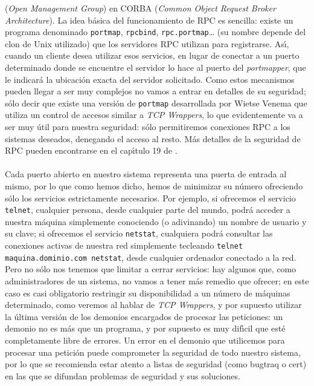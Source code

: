 ({\it Open Management Group}) en CORBA ({\it Common Object Request Broker 
Architecture}). La idea b\'asica del funcionamiento de RPC es sencilla: existe
un programa denominado {\tt portmap}, {\tt rpcbind}, {\tt rpc.portmap}\ldots
(su nombre depende del clon de Unix utilizado) que los servidores RPC utilizan
para registrarse. As\'{\i}, cuando un cliente desea utilizar esos servicios, 
en lugar de conectar a un puerto determinado donde se encuentre el servidor lo
hace al puerto del {\it portmapper}, que le indicar\'a la ubicaci\'on exacta
del servidor solicitado. Como estos mecanismos pueden llegar a ser muy complejos
no vamos a entrar en detalles de su seguridad; s\'olo decir que existe una
versi\'on de {\tt portmap} desarrollada por Wietse Venema que utiliza un
control de accesos similar a {\it TCP Wrappers}, lo que evidentemente va a ser
muy \'util para nuestra seguridad: s\'olo permitiremos conexiones RPC a los
sistemas deseados, denegando el acceso al resto. M\'as detalles de la seguridad
de RPC pueden encontrarse en el cap\'{\i}tulo 19 de \cite{kn:spa96}.\\
\\Cada puerto abierto en nuestro sistema representa una puerta de entrada al
mismo, por lo que como hemos dicho, hemos de minimizar su n\'umero ofreciendo
s\'olo los servicios estrictamente necesarios. Por ejemplo, si ofrecemos el
servicio {\tt telnet}, cualquier persona, desde cualquier parte del mundo, 
podr\'a acceder a nuestra m\'aquina simplemente conociendo (o adivinando) un
nombre de usuario y su clave; si ofrecemos el servicio {\tt netstat}, cualquiera
podr\'a consultar las conexiones activas de nuestra red simplemente tecleando
{\tt telnet maquina.dominio.com netstat}, desde cualquier ordenador conectado
a la red. Pero no s\'olo nos tenemos que limitar a cerrar servicios: hay algunos
que, como administradores de un sistema, no vamos a tener m\'as remedio que
ofrecer; en este caso es casi obligatorio restringir su disponibilidad a un
n\'umero de m\'aquinas determinado, como veremos al hablar de {\it TCP 
Wrappers}, y por supuesto utilizar la \'ultima versi\'on de los demonios
encargados de procesar las peticiones: un demonio no es m\'as que un programa,
y por supuesto es muy dif\'{\i}cil que est\'e completamente libre de errores. 
Un error en el demonio que utilicemos para procesar una petici\'on puede 
comprometer la seguridad de todo nuestro sistema, por lo que se recomienda
estar atento a listas de seguridad (como {\sc bugtraq} o {\sc cert}) en las que
se difundan problemas de seguridad y sus soluciones.
